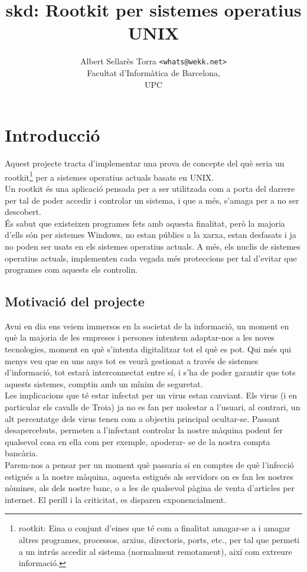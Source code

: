 \documentclass[a4paper]{article}
\author{Albert Sellarès Torra \texttt{<whats@wekk.net>}\\
        Facultat d'Informàtica de Barcelona,\\
        UPC\\}
\title{skd: Rootkit per sistemes operatius UNIX}
\begin{document}
\maketitle
\newpage

\section{Introducció}

Aquest projecte tracta d'implementar una prova de concepte del què seria un rootkit\footnote{rootkit:
Eina o conjunt d'eines que té com a finalitat amagar-se a i amagar altres programes, processos, arxius, 
directoris, ports, etc., per tal que permeti a un intrús accedir al sistema (normalment remotament), 
així com extreure informació.} per a sistemes operatius actuals basats en UNIX.\\ 

Un rootkit és una aplicació pensada per a ser utilitzada com a porta del darrere per tal de
poder accedir i controlar un sistema, i que a més, s'amaga per a no ser descobert.\\

És sabut que existeixen programes fets amb aquesta finalitat, però la majoria d'ells són
per sistemes Windows, no estan públics a la xarxa, estan desfasats i ja no poden ser
usats en els sistemes operatius actuals. A més, els nuclis de sistemes operatius actuals, implementen cada vegada més
proteccions per tal d'evitar que programes com aquests els controlin.

\subsection{Motivació del projecte}

Avui en dia ens veiem immersos en la societat de la informació, un moment en què la
majoria de les empreses i persones intentem adaptar-nos a les noves tecnologies,
moment en què s'intenta digitalitzar tot el què es pot. Qui més qui menys veu que en uns anys tot es veurà gestionat a través de sistemes
d'informació, tot estarà interconnectat entre sí, i s'ha de poder garantir que tots aquests
sistemes, comptin amb un mínim de seguretat.\\


Les implicacions que té estar infectat per un virus estan canviant. Els virus (i en particular
els cavalls de Troia) ja no es fan per molestar a l'usuari, al contrari, un alt percentatge dels
virus tenen com a objectiu principal ocultar-se. Passant desapercebuts, permeten a l'infectant
controlar la nostre màquina podent fer qualsevol cosa en ella com per exemple, apoderar-
se de la nostra compta bancària.\\
Parem-nos a pensar per un moment què passaria si en comptes de què l'infecció estigués
a la nostre màquina, aquesta estigués als servidors on es fan les nostres nòmines, als dels
nostre banc, o a les de qualsevol pàgina de venta d'articles per internet. El perill i la
criticitat, es disparen exponencialment.\\
\end{document}

